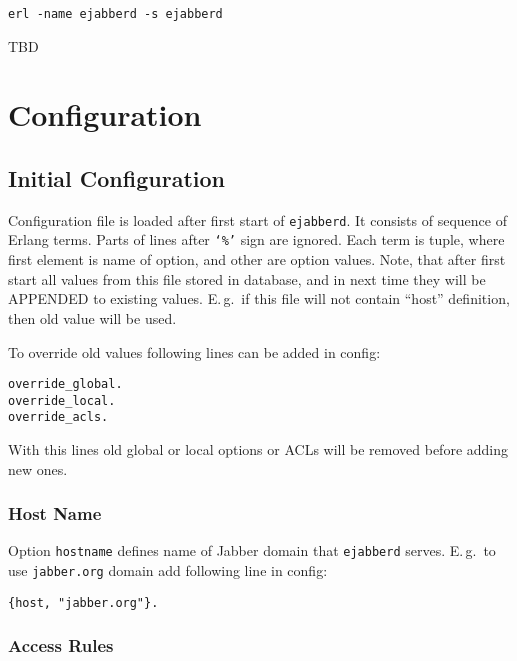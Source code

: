 \documentclass[10pt]{article}
\newcommand{\ejabberd}{\texttt{ejabberd}}
\newcommand{\Jabber}{Jabber}
\begin{document}
\begin{verbatim}
erl -name ejabberd -s ejabberd
\end{verbatim}

TBD

\section{Configuration}
\label{sec:configuration}

\subsection{Initial Configuration}
\label{sec:initconfig}

%

Configuration file is loaded after first start of \ejabberd{}.  It consists of
sequence of Erlang terms.  Parts of lines after \texttt{`\%'} sign are ignored.
Each term is tuple, where first element is name of option, and other are option
values.  Note, that after first start all values from this file stored in
database, and in next time they will be APPENDED to existing values.  E.\,g.\
if this file will not contain ``host'' definition, then old value will be
used.

To override old values following lines can be added in config:
\begin{verbatim}
override_global.
override_local.
override_acls.
\end{verbatim}
With this lines old global or local options or ACLs will be removed before
adding new ones.


\subsubsection{Host Name}
\label{sec:confighostname}

Option \texttt{hostname} defines name of \Jabber{} domain that \ejabberd{}
serves.  E.\,g.\ to use \texttt{jabber.org} domain add following line in config:
\begin{verbatim}
{host, "jabber.org"}.
\end{verbatim}




\subsubsection{Access Rules}
\label{sec:configaccess}
\end{document}
